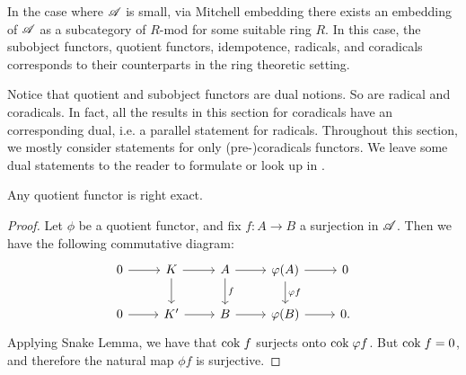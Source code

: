 \begin{rmk}
In the case where $\mathscr{A}$ is small, via Mitchell embedding 
there exists an embedding of $\mathscr{A}$ as a subcategory of $R$-mod
for some suitable ring $R$. In this case, the subobject functors, 
quotient functors, idempotence, radicals, and coradicals 
corresponds to their counterparts in the ring theoretic setting.
\end{rmk}

\begin{rmk}\label{rmk_rad_corad_dual}
Notice that quotient and subobject functors are dual notions. So 
are radical and coradicals. In fact, all the results in this 
section for coradicals have an corresponding dual, i.e. a parallel 
statement for radicals. Throughout this section, we mostly 
consider statements for only (pre-)coradicals functors. We leave 
some dual statements to the reader to formulate or look up in 
\cite{DTor}.
\end{rmk}

\begin{prop}\label{prop_quotient_right_exact}
Any quotient functor is right exact.
\end{prop}
\begin{proof}
Let $\phi$ be a quotient functor, and fix $f: A \to B$ a 
surjection in $\mathscr{A}$. Then we have the following commutative 
diagram:
\[
\begin{tikzcd}
0 \arrow{r} &
K \arrow{r} \arrow{d} &
A \arrow{r} \arrow{d}{f} &
\phi(A) \arrow{r} \arrow{d}{\phi f} &
0 \\
0 \arrow{r} &
K' \arrow{r} &
B \arrow{r} &
\phi(B) \arrow{r} &
0.
\end{tikzcd}
\]
Applying Snake Lemma, we have that $\mathrm{cok}\; f$ surjects onto
$\mathrm{cok}\; \varphi f$. But $\mathrm{cok}\; f = 0$, and therefore the natural map 
$\phi f$ is surjective.
\end{proof}

